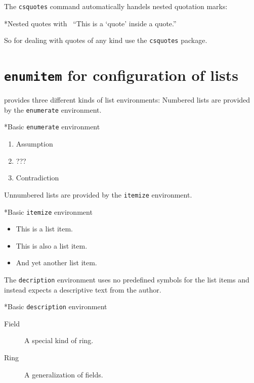The \texttt{csquotes} command automatically handels nested quotation marks:
\begin{showlatex}*{Nested quotes with~}
\enquote{This is a \enquote{quote} inside a quote.}
\end{showlatex}
So for dealing with quotes of any kind use the \texttt{csquotes} package.





\section{\texttt{enumitem} for configuration of lists}

 provides three different kinds of list environments:
Numbered lists are provided by the \texttt{enumerate} environment.

\begin{showlatex}*{Basic \texttt{enumerate} environment}
\begin{enumerate}
  \item
    Assumption
  \item
    ???
  \item
    Contradiction
\end{enumerate}
\end{showlatex}
Unnumbered lists are provided by the \texttt{itemize} environment.
\begin{showlatex}*{Basic \texttt{itemize} environment}
\begin{itemize}
  \item
    This is a list item.
  \item
    This is also a list item.
  \item
    And yet another list item.
\end{itemize}
\end{showlatex}
The \texttt{decription} environment uses no predefined symbols for the list items and instead expects a descriptive text from the author.
\begin{showlatex}*{Basic \texttt{description} environment}
\begin{description}
  \item[Field]
    A special kind of ring.
  \item[Ring]
    A generalization of fields.
\end{description}
\end{showlatex}

